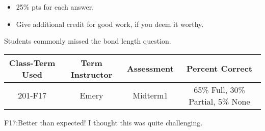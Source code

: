 \begin{rubric}

\begin{itemize}
	\item 25\% pts for each answer.
	\item Give additional credit for good work, if you deem it worthy.
\end{itemize}

\end{rubric}

\begin{outcomes}
Students commonly missed the bond length question.
	\begin{center}
		\begin{tabular}{cccc}
			\hline\hline
			Class-Term Used & Term Instructor & Assessment & Percent Correct\\
			\hline
			201-F17 & Emery & Midterm1 & 65\% Full, 30\% Partial, 5\% None\\
			\hline
		\end{tabular}
	\end{center}
\end{outcomes}

\begin{comments}

F17:Better than expected! I thought this was quite challenging.
	
\end{comments}
